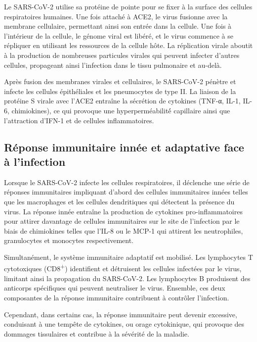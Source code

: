 \documentclass[
  a4paper,
  DIV=11,
  numbers=noendperiod,
  listof=totoc]{scrreprt}
\begin{document}
Le \ac{SARS-CoV-2} utilise sa protéine de pointe pour se fixer à la
surface des cellules respiratoires humaines. Une fois attaché à
\ac{ACE2}, le virus fusionne avec la membrane cellulaire, permettant
ainsi son entrée dans la cellule. Une fois à l'intérieur de la cellule,
le génome viral est libéré, et le virus commence à se répliquer en
utilisant les ressources de la cellule hôte. La réplication virale
aboutit à la production de nombreuses particules virales qui peuvent
infecter d'autres cellules, propageant ainsi l'infection dans le tissu
pulmonaire et au-delà.

Après fusion des membranes virales et cellulaires, le SARS-CoV-2 pénètre
et infecte les cellules épithéliales et les pneumocytes de type II. La
liaison de la protéine S virale avec l'\ac{ACE2} entraîne la sécrétion
de cytokines (TNF-α, IL-1, IL-6, chimiokines), ce qui provoque une
hyperperméabilité́ capillaire ainsi que l'attraction d'\ac{IFN-1} et de
cellules inflammatoires.

\subsection{Réponse immunitaire innée et adaptative face à
l'infection}\label{ruxe9ponse-immunitaire-innuxe9e-et-adaptative-face-uxe0-linfection}

Lorsque le SARS-CoV-2 infecte les cellules respiratoires, il déclenche
une série de réponses immunitaires impliquant d'abord des cellules
immunitaires innées telles que les macrophages et les cellules
dendritiques qui détectent la présence du virus. La réponse innée
entraîne la production de cytokines pro-inflammatoires pour attirer
davantage de cellules immunitaires sur le site de l'infection par le
biais de chimiokines telles que l'IL-8 ou le MCP-1 qui attirent les
neutrophiles, granulocytes et monocytes respectivement.

Simultanément, le système immunitaire adaptatif est mobilisé. Les
lymphocytes T cytotoxiques (CD8\textsuperscript{+}) identifient et
détruisent les cellules infectées par le virus, limitant ainsi la
propagation du \ac{SARS-CoV-2}. Les lymphocytes B produisent des
anticorps spécifiques qui peuvent neutraliser le virus. Ensemble, ces
deux composantes de la réponse immunitaire contribuent à contrôler
l'infection.

Cependant, dans certains cas, la réponse immunitaire peut devenir
excessive, conduisant à une tempête de cytokines, ou orage cytokinique,
qui provoque des dommages tissulaires et contribue à la sévérité de la
maladie.
\end{document}
